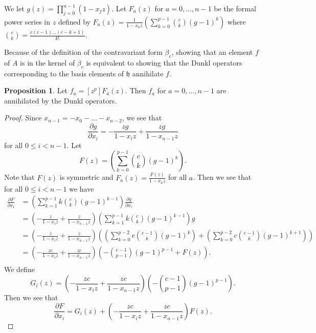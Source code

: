 \documentclass{amsart}
\numberwithin{equation}{section}
\theoremstyle{definition}
\newtheorem{proposition}[equation]{Proposition}
\newcommand{\h}{\mathfrak{h}}
\begin{document}
We let $g(z)=\prod_{j=0}^{n-1} (1-x_jz)$. Let $F_a(z)$ for $a=0,\dots,n-1$ be the formal power series in $z$ defined by $F_a(z)=\frac{1}{1-x_az} \left( \sum_{k=0}^{p-1} \binom{c}{k}(g-1)^k\right)$ where $\binom{c}{k}=\frac{c(c-1)\dots(c-k+1)}{k!}$. 

Because of the definition of the contravariant form $\beta_c$, showing that an element $f$ of $A$ is in the kernel of $\beta_c$ is equivalent to showing that the Dunkl operators corresponding to the basis elements of $\h$ annihilate $f$.

\begin{proposition}\label{prop:ann} Let $f_a=[z^p]F_a(z)$. Then $f_a$ for $a=0,\dots,n-1$ are annihilated by the Dunkl operators. 
\end{proposition}

\begin{proof}

Since $x_{n-1}=-x_0-\dots-x_{n-2}$, we see that $$\frac{\partial g}{\partial x_i}=-\frac{zg}{1-x_iz}+\frac{zg}{1-x_{n-1}z}$$ for all $0 \le i < n-1$. Let $$F(z) =\left(\sum_{k=0}^{p-1} \binom{c}{k} (g-1)^k\right).$$ Note that $F(z)$ is symmetric and $F_a(z)=\frac{F(z)}{1-x_az}$ for all $a$. Then we see that for all $0 \le i < n-1$ we have 
\begin{align*}
\frac{\partial F}{\partial x_i}%
&=\left(\sum_{k=1}^{p-1}k\binom{c}{k}(g-1)^{k-1}\right)\frac{\partial g}{\partial x_i}\\
&=\left(-\frac{z}{1-x_iz}+\frac{z}{1-x_{n-1}z}\right)\left(\sum_{k=1}^{p-1}k\binom{c}{k}(g-1)^{k-1}\right)g\\
&=\left(-\frac{z}{1-x_iz}+\frac{z}{1-x_{n-1}z}\right)\left(\left(\sum_{k=0}^{p-2}c\binom{c-1}{k}(g-1)^{k}\right)+\left(\sum_{k=0}^{p-2}c\binom{c-1}{k}(g-1)^{k+1}\right)\right)\\
&=\left(-\frac{zc}{1-x_iz}+\frac{zc}{1-x_{n-1}z}\right)\left(-\binom{c-1}{p-1}(g-1)^{p-1}+F(z)\right).\\
\end{align*}
We define $$G_i(z)=\left(-\frac{zc}{1-x_iz}+\frac{zc}{1-x_{n-1}z}\right)\left(-\binom{c-1}{p-1}(g-1)^{p-1}\right).$$ Then we see that $$\frac{\partial F}{\partial x_i}=G_i(z)+\left(-\frac{zc}{1-x_iz}+\frac{zc}{1-x_{n-1}z}\right)F(z).$$


\end{proof}
\end{document}
